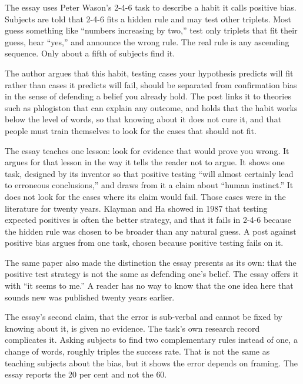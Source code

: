 \begin{afterword}
\summaryhead

The essay uses Peter Wason's 2-4-6 task to describe a habit it calls positive bias. Subjects are told that 2-4-6 fits a hidden rule and may test other triplets. Most guess something like ``numbers increasing by two,'' test only triplets that fit their guess, hear ``yes,'' and announce the wrong rule. The real rule is any ascending sequence. Only about a fifth of subjects find it.

The author argues that this habit, testing cases your hypothesis predicts will fit rather than cases it predicts will fail, should be separated from confirmation bias in the sense of defending a belief you already hold. The post links it to theories such as phlogiston that can explain any outcome, and holds that the habit works below the level of words, so that knowing about it does not cure it, and that people must train themselves to look for the cases that should not fit.

\responsehead

The essay teaches one lesson: look for evidence that would prove you wrong. It argues for that lesson in the way it tells the reader not to argue. It shows one task, designed by its inventor so that positive testing ``will almost certainly lead to erroneous conclusions,'' and draws from it a claim about ``human instinct.'' It does not look for the cases where its claim would fail. Those cases were in the literature for twenty years. Klayman and Ha showed in 1987 that testing expected positives is often the better strategy, and that it fails in 2-4-6 because the hidden rule was chosen to be broader than any natural guess. A post against positive bias argues from one task, chosen because positive testing fails on it.

The same paper also made the distinction the essay presents as its own: that the positive test strategy is not the same as defending one's belief. The essay offers it with ``it seems to me.'' A reader has no way to know that the one idea here that sounds new was published twenty years earlier.

The essay's second claim, that the error is sub-verbal and cannot be fixed by knowing about it, is given no evidence. The task's own research record complicates it. Asking subjects to find two complementary rules instead of one, a change of words, roughly triples the success rate. That is not the same as teaching subjects about the bias, but it shows the error depends on framing. The essay reports the 20 per cent and not the 60.


\end{afterword}
